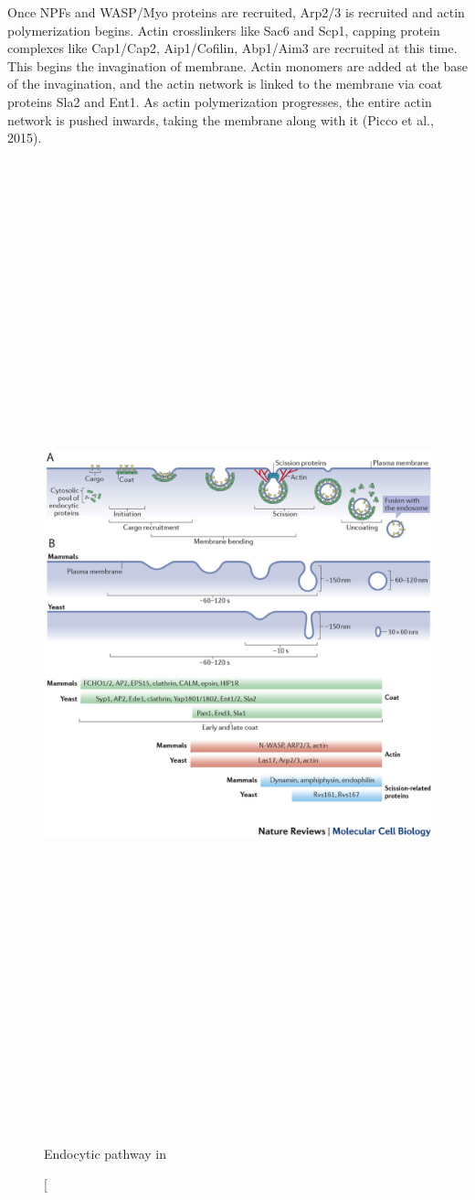 			\vspace{5mm}
Once NPFs and WASP/Myo proteins are recruited, Arp2/3 is recruited and actin polymerization begins. Actin crosslinkers like Sac6 and Scp1, capping protein complexes like Cap1/Cap2, Aip1/Cofilin, Abp1/Aim3 are recruited at this time. This begins the invagination of membrane. Actin monomers are added at the base of the invagination, and the actin network is linked to the membrane via coat proteins Sla2 and Ent1. As actin polymerization progresses, the entire actin network is pushed inwards, taking the membrane along with it (Picco et al., 2015).	

\newpage
\begin{figure}[H]
	\centering
	\hspace{-1.5cm}
		\includegraphics[width=15cm, height=28cm, keepaspectratio]{figures/intro/Fig2_kaksonen}
	\caption[Endocytic pathway in
\end{figure}

